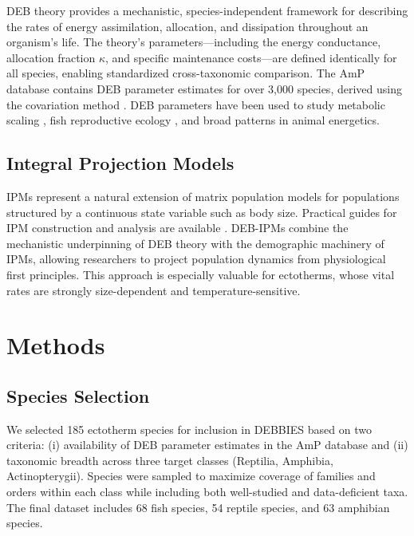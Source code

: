 \documentclass[11pt]{article}
\begin{document}
DEB theory \citep{kooijman2010} provides a mechanistic, species-independent framework for describing the rates of energy assimilation, allocation, and dissipation throughout an organism's life. The theory's parameters---including the energy conductance, allocation fraction $\kappa$, and specific maintenance costs---are defined identically for all species, enabling standardized cross-taxonomic comparison. The AmP database \citep{marques2018} contains DEB parameter estimates for over 3,000 species, derived using the covariation method \citep{lika2011}. DEB parameters have been used to study metabolic scaling \citep{nisbet2000}, fish reproductive ecology \citep{pecquerie2009}, and broad patterns in animal energetics.

\subsection{Integral Projection Models}

IPMs \citep{easterling2000, ellner2006} represent a natural extension of matrix population models \citep{caswell2001} for populations structured by a continuous state variable such as body size. Practical guides for IPM construction and analysis are available \citep{merow2014}. DEB-IPMs \citep{smallegange2017} combine the mechanistic underpinning of DEB theory with the demographic machinery of IPMs, allowing researchers to project population dynamics from physiological first principles. This approach is especially valuable for ectotherms, whose vital rates are strongly size-dependent and temperature-sensitive.

\section{Methods}

\subsection{Species Selection}

We selected 185 ectotherm species for inclusion in DEBBIES based on two criteria: (i) availability of DEB parameter estimates in the AmP database \citep{marques2018} and (ii) taxonomic breadth across three target classes (Reptilia, Amphibia, Actinopterygii). Species were sampled to maximize coverage of families and orders within each class while including both well-studied and data-deficient taxa. The final dataset includes 68 fish species, 54 reptile species, and 63 amphibian species.
\end{document}

